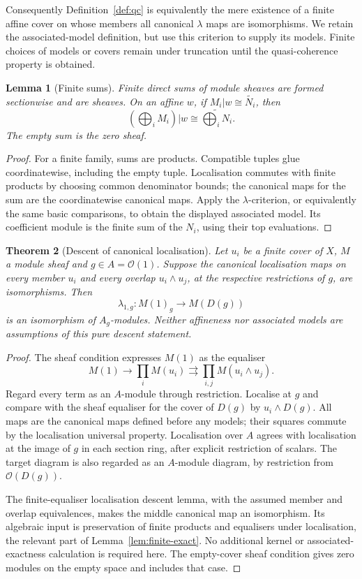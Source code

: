 \documentclass[11pt]{amsart}
\newtheorem{theorem}{Theorem}[section]
\newtheorem{lemma}[theorem]{Lemma}
\theoremstyle{definition}\newtheorem{definition}[theorem]{Definition}
\theoremstyle{remark}\newtheorem{remark}[theorem]{Remark}
\newcommand{\OO}{\mathcal O}
\begin{document}
Consequently Definition~\ref{def:qc} is equivalently the mere existence
of a finite affine cover on whose members all canonical $\lambda$ maps
are isomorphisms. We retain the associated-model definition, but use
this criterion to supply its models. Finite choices of models or covers
remain under truncation until the quasi-coherence property is obtained.

\begin{lemma}[Finite sums]\label{lem:finite-sums}
Finite direct sums of module sheaves are formed sectionwise and are
sheaves. On an affine $w$, if $M_i|w\cong\widetilde{N_i}$, then
\[
 (\bigoplus_iM_i)|w\cong\widetilde{\bigoplus_iN_i}.
\]
The empty sum is the zero sheaf.
\end{lemma}
\begin{proof}
For a finite family, sums are products. Compatible tuples glue
coordinatewise, including the empty tuple. Localisation commutes with
finite products by choosing common denominator bounds; the canonical
maps for the sum are the coordinatewise canonical maps. Apply the
$\lambda$-criterion, or equivalently the same basic comparisons, to
obtain the displayed associated model. Its coefficient module is the
finite sum of the $N_i$, using their top evaluations.
\end{proof}

\begin{theorem}[Descent of canonical localisation]
\label{thm:sectionloc}\label{thm:localisation-descent}
Let $u_i$ be a finite cover of $X$, $M$ a module sheaf and
$g\in A=\OO(1)$. Suppose the canonical localisation maps on every
member $u_i$ and every overlap $u_i\wedge u_j$, at the respective
restrictions of $g$, are isomorphisms. Then
\[
 \lambda_{1,g}:M(1)_g\longrightarrow M(D(g))
\]
is an isomorphism of $A_g$-modules.
Neither affineness nor associated models are assumptions of this
pure descent statement.
\end{theorem}
\begin{proof}
The sheaf condition expresses $M(1)$ as the equaliser
\[
 M(1)\longrightarrow\prod_iM(u_i)
 \rightrightarrows\prod_{i,j}M(u_i\wedge u_j).
\]
Regard every term as an $A$-module through restriction. Localise at
$g$ and compare with the sheaf equaliser for the cover of $D(g)$ by
$u_i\wedge D(g)$. All maps are the canonical maps defined before any
models; their squares commute by the localisation universal property.
Localisation over $A$ agrees with localisation at the image of $g$
in each section ring, after explicit restriction of scalars. The target
diagram is also regarded as an $A$-module diagram, by restriction from
$\OO(D(g))$.

The finite-equaliser localisation descent lemma, with the assumed
member and overlap equivalences, makes the middle canonical map an
isomorphism. Its algebraic input is preservation of finite products
and equalisers under localisation, the relevant part of
Lemma~\ref{lem:finite-exact}. No additional kernel or associated-exactness
calculation is required here. The empty-cover sheaf condition gives
zero modules on the empty space and includes that case.
\end{proof}
\end{document}
